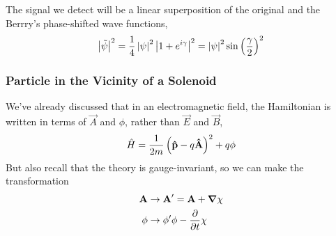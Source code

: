 \documentclass[a4paper]{article}
\begin{document}
The signal we detect will be a linear superposition of the original and the
Berrry's phase-shifted wave functions,
\begin{align*}
	\left\lvert \tilde{\psi}\right\rvert^2 = \frac{1}{4}\left\lvert \psi\right\rvert^2\left\lvert 1+e^{i\gamma}\right\rvert^2
	= \left\lvert \psi\right\rvert^2\sin\left(\frac{\gamma}{2}\right)^2
\end{align*}

\subsubsection{Particle in the Vicinity of a Solenoid}
We've already discussed that in an electromagnetic field, the Hamiltonian is
written in terms of $\vec{A}$ and $\phi$, rather than $\vec{E}$ and $\vec{B}$,
\[
	\hat{H} = \frac{1}{2m}\left(\boldsymbol{\mathbf{\hat{p}}}-q\boldsymbol{\mathbf{\hat{A}}}\right)^2 + q\phi
\]
But also recall that the theory is gauge-invariant, so we can make the
transformation
\begin{align*}
	\vec{A} &\to \vec{A}' = \vec{A} + \del\chi\\
	\phi &\to \phi'  \phi - \pd{t}\chi
\end{align*}
\end{document}
